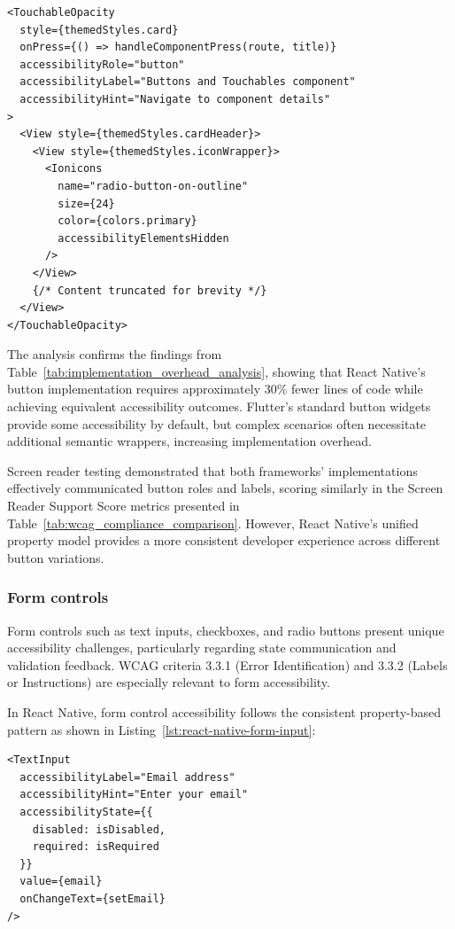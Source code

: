 \begin{lstlisting}[style=ReactNativeStyle, caption=AccessibleHub's React Native implementation of accessible buttons, label=lst:accessiblehub-button]
<TouchableOpacity
  style={themedStyles.card}
  onPress={() => handleComponentPress(route, title)}
  accessibilityRole="button"
  accessibilityLabel="Buttons and Touchables component"
  accessibilityHint="Navigate to component details"
>
  <View style={themedStyles.cardHeader}>
    <View style={themedStyles.iconWrapper}>
      <Ionicons
        name="radio-button-on-outline"
        size={24}
        color={colors.primary}
        accessibilityElementsHidden
      />
    </View>
    {/* Content truncated for brevity */}
  </View>
</TouchableOpacity>
\end{lstlisting}

\pagebreak

The analysis confirms the findings from Table~\ref{tab:implementation_overhead_analysis}, showing that React Native's button implementation requires approximately 30\% fewer lines of code while achieving equivalent accessibility outcomes. Flutter's standard button widgets provide some accessibility by default, but complex scenarios often necessitate additional semantic wrappers, increasing implementation overhead.

Screen reader testing demonstrated that both frameworks' implementations effectively communicated button roles and labels, scoring similarly in the Screen Reader Support Score metrics presented in Table~\ref{tab:wcag_compliance_comparison}. However, React Native's unified property model provides a more consistent developer experience across different button variations.

\subsubsection{Form controls}
\label{subsubsec:form-controls}

Form controls such as text inputs, checkboxes, and radio buttons present unique accessibility challenges, particularly regarding state communication and validation feedback. WCAG criteria 3.3.1 (Error Identification) and 3.3.2 (Labels or Instructions) are especially relevant to form accessibility.

In React Native, form control accessibility follows the consistent property-based pattern as shown in Listing~\ref{lst:react-native-form-input}:

\begin{lstlisting}[style=ReactNativeStyle, caption=Accessible form input in React Native, label=lst:react-native-form-input]
<TextInput
  accessibilityLabel="Email address"
  accessibilityHint="Enter your email"
  accessibilityState={{ 
    disabled: isDisabled,
    required: isRequired 
  }}
  value={email}
  onChangeText={setEmail}
/>
\end{lstlisting}

